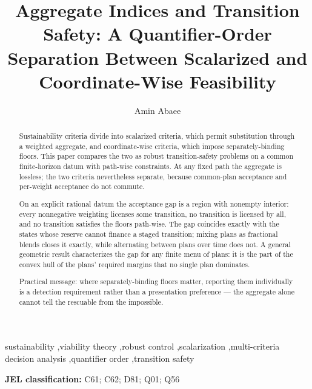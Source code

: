 \documentclass[review,11pt]{elsarticle}
\providecommand{\jel}[1]{\par\noindent\textbf{JEL classification:} #1\par}
\begin{document}
\begin{frontmatter}

\title{Aggregate Indices and Transition Safety: A Quantifier-Order Separation Between Scalarized and Coordinate-Wise Feasibility}

\author[aff]{Amin Abaee}

\address[aff]{Independent Researcher, \href{https://orcid.org/0000-0002-0019-1842}{ORCID: 0000-0002-0019-1842}, \href{mailto:amin\_abaee@ut.ac.ir}{amin\_abaee@ut.ac.ir}}

\begin{abstract}

Sustainability criteria divide into scalarized criteria, which permit
substitution through a weighted aggregate, and coordinate-wise criteria,
which impose separately-binding floors. This paper compares the two as
robust transition-safety problems on a common finite-horizon datum with
path-wise constraints. At any fixed path the aggregate is lossless; the
two criteria nevertheless separate, because common-plan acceptance and
per-weight acceptance do not commute.

On an explicit rational datum the acceptance gap is a region with
nonempty interior: every nonnegative weighting licenses some transition,
no transition is licensed by all, and no transition satisfies the floors
path-wise. The gap coincides exactly with the states whose reserve
cannot finance a staged transition; mixing plans as fractional blends
closes it exactly, while alternating between plans over time does not.
A general geometric result characterizes the gap for any finite menu of
plans: it is the part of the convex hull of the plans' required margins
that no single plan dominates.

Practical message: where separately-binding floors matter, reporting
them individually is a detection requirement rather than a presentation
preference --- the aggregate alone cannot tell the rescuable from the
impossible.

\end{abstract}

\begin{keyword}
sustainability \sep viability theory \sep robust control \sep scalarization \sep multi-criteria decision analysis \sep quantifier order \sep transition safety
\end{keyword}

\jel{C61; C62; D81; Q01; Q56}


\end{frontmatter}
\end{document}
